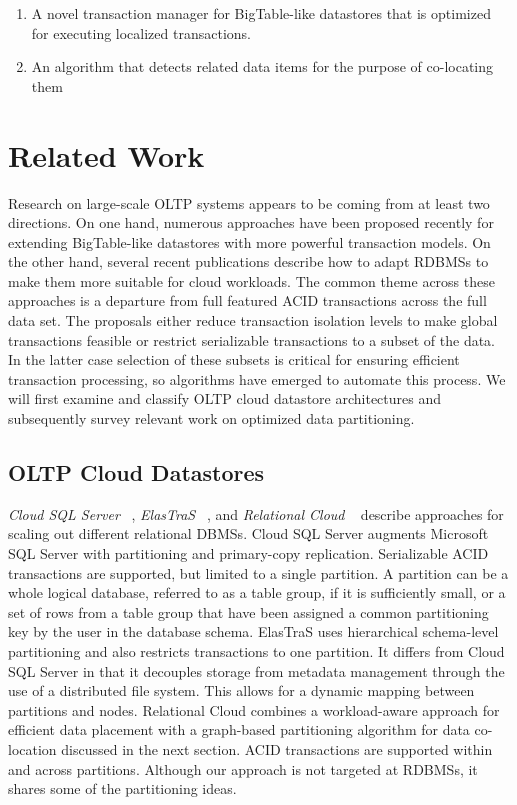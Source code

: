 \documentclass[10pt,final,journal]{IEEEtran}
\begin{document}
\begin{enumerate}
\item A novel transaction manager for BigTable-like datastores that is optimized for executing localized transactions.
\item An algorithm that detects related data items for the purpose of co-locating them
\end{enumerate}

\section{Related Work}
Research on large-scale OLTP systems appears to be coming from at least two directions. On one hand, numerous approaches have been proposed recently for extending BigTable-like datastores with more powerful transaction models. On the other hand, several recent publications describe how to adapt RDBMSs to make them more suitable for cloud workloads. The common theme across these approaches is a departure from full featured ACID transactions across the full data set. The proposals either reduce transaction isolation levels to make global transactions feasible or restrict serializable transactions to a subset of the data. In the latter case selection of these subsets is critical for ensuring efficient transaction processing, so algorithms have emerged to automate this process. We will first examine and classify OLTP cloud datastore architectures and subsequently survey relevant work on optimized data partitioning.

\subsection{OLTP Cloud Datastores}
\emph{Cloud SQL Server} ~\cite{Campbell:2010:ESF:1807167.1807280, Bernstein:2011:AMS:2004686.2005651}, \emph{ElasTraS} ~\cite{Das:2009:EET:1855533.1855540, Das:2010:EAE}, and \emph{Relational Cloud} ~\cite{Curino:2011:JPMWMBZ11} describe approaches for scaling out different relational DBMSs. Cloud SQL Server augments Microsoft SQL Server with partitioning and primary-copy replication. Serializable ACID transactions are supported, but limited to a single partition. A partition can be a whole logical database, referred to as a table group, if it is sufficiently small, or a set of rows from a table group that have been assigned a common partitioning key by the user in the database schema. ElasTraS uses hierarchical schema-level partitioning and also restricts transactions to one partition. It differs from Cloud SQL Server in that it decouples storage from metadata management through the use of a distributed file system. This allows for a dynamic mapping between partitions and nodes. Relational Cloud combines a workload-aware approach for efficient data placement with a graph-based partitioning algorithm for data co-location discussed in the next section. ACID transactions are supported within and across partitions. Although our approach is not targeted at RDBMSs, it shares some of the partitioning ideas.
\end{document}
